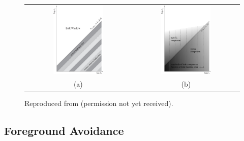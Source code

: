 \begin{bibunit}
\begin{figure}
    \centering
    \begin{tabular}{cc}
        \includegraphics[width=0.49\textwidth]{figures/chapter1/morales-foreground-wedge-illustration} &
        \includegraphics[width=0.49\textwidth]{figures/chapter1/morales-foreground-wedge-calibration-errors} \\
        (a) & (b) \\
    \end{tabular}
    \caption{
        Reproduced from \citet{2012ApJ...752..137M} (permission not yet received).
    }
    \label{fig:morales-foreground-wedge}
\end{figure}

\subsection{Foreground Avoidance}


\end{bibunit}
